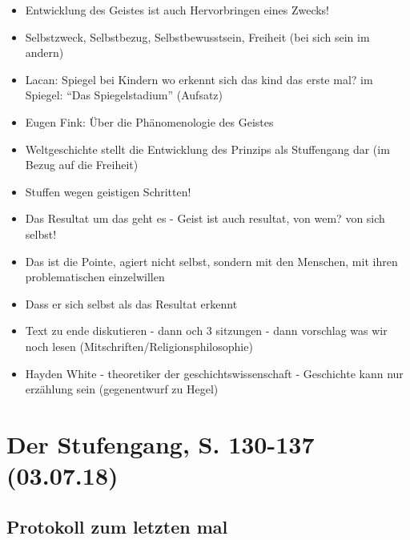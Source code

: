 \documentclass[emulatestandardclasses]{scrartcl}
\begin{document}
\begin{itemize}
  \item Entwicklung des Geistes ist auch Hervorbringen eines Zwecks!
  \item Selbstzweck, Selbstbezug, Selbstbewusstsein, Freiheit (bei sich sein im andern)
  \item Lacan: Spiegel bei Kindern wo erkennt sich das kind das erste mal? im Spiegel: "`Das Spiegelstadium"' (Aufsatz)
  \item Eugen Fink: Über die Phänomenologie des Geistes
  \item Weltgeschichte stellt die Entwicklung des Prinzips als Stuffengang dar (im Bezug auf die Freiheit)
  \item Stuffen wegen geistigen Schritten!
  \item Das Resultat um das geht es - Geist ist auch resultat, von wem? von sich selbst!
  \item Das ist die Pointe, agiert nicht selbst, sondern mit den Menschen, mit ihren problematischen einzelwillen
  \item Dass er sich selbst als das Resultat erkennt
  \item Text zu ende diskutieren - dann och 3 sitzungen - dann vorschlag was wir noch lesen (Mitschriften/Religionsphilosophie)
  \item Hayden White - theoretiker der geschichtswissenschaft - Geschichte kann nur erzählung sein (gegenentwurf zu Hegel)
\end{itemize}


\section{Der Stufengang, S. 130-137\\(03.07.18)}

\subsection{Protokoll zum letzten mal}
\end{document}
